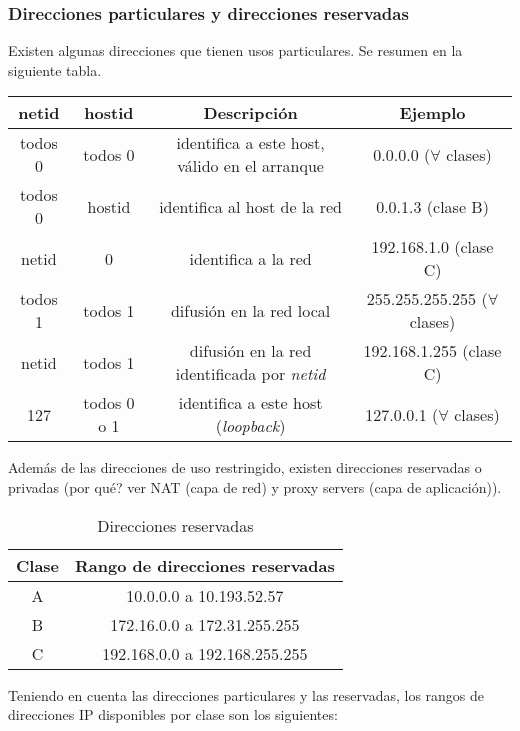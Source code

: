 \documentclass{book}
\begin{document}
	\pagebreak
	\subsubsection{Direcciones particulares y direcciones reservadas}
	Existen algunas direcciones que tienen usos particulares. Se resumen en la siguiente tabla.
	
	\begin{table}[H]
		\centering
		\begin{tabular}{|c|c|c|c|}
			\hline
			netid&hostid&Descripción&Ejemplo\\
			\hline
			todos 0&todos 0&identifica a este host, válido en el arranque&0.0.0.0 ($\forall$ clases)\\
			\hline
			todos 0&hostid&identifica al host de la red&0.0.1.3 (clase B)\\
			\hline
			netid&0&identifica a la red&192.168.1.0 (clase C)\\
			\hline
			todos 1&todos 1&difusión en la red local&255.255.255.255 ($\forall$ clases)\\
			\hline
			netid&todos 1&difusión en la red identificada por \textit{netid}&192.168.1.255 (clase C)\\
			\hline
			127&todos 0 o 1&identifica a este host (\textit{loopback})&127.0.0.1 ($\forall$ clases)\\
			\hline
		\end{tabular}
	\end{table}
	
	Además de las direcciones de uso restringido, existen direcciones reservadas o privadas (por qué? ver NAT (capa de red) y proxy servers (capa de aplicación)).
	
	\begin{table}[H]
		\centering
		\begin{tabular}{|c|c|}
			\hline
			Clase&Rango de direcciones reservadas\\
			\hline
			A&10.0.0.0 a 10.193.52.57\\
			\hline
			B&172.16.0.0 a 172.31.255.255\\
			\hline
			C&192.168.0.0 a 192.168.255.255\\
			\hline
		\end{tabular}
		\caption{Direcciones reservadas}
		\label{tab:reservadas}
	\end{table}
	
	Teniendo en cuenta las direcciones particulares y las reservadas, los rangos de direcciones IP disponibles por clase son los siguientes:
	
\end{document}

